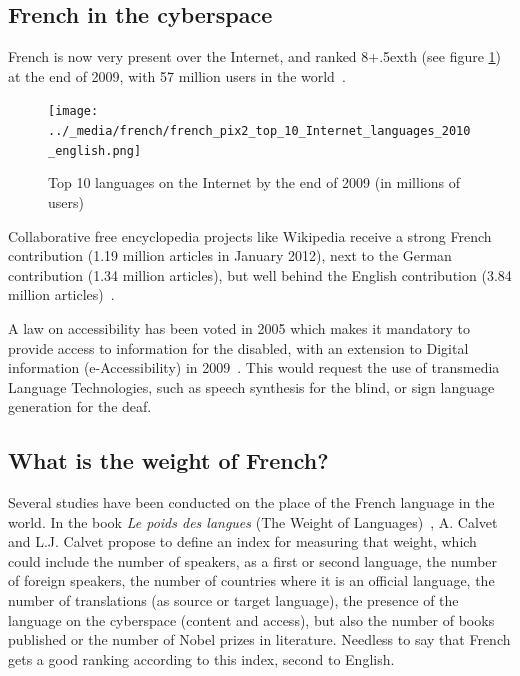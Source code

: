 \begin{multicols}{2}
\subsection{French in the cyberspace}

French is now very present over the Internet, and ranked
8\raise+.5ex\hbox{th} (see figure \ref{fig:internettop10_en}) at the end
of 2009, with 57 million users in the world~\cite{internettop10}.

\begin{figure}[ht]
\begin{center}
 \texttt{[image: ../\_media/french/french\_pix2\_top\_10\_Internet\_languages\_2010\_english.png]}
  \caption{Top 10 languages on the Internet by the end of 2009 (in millions of users)~\cite{internettop10}}
  \label{fig:internettop10_en}
\end{center}
\end{figure}

Collaborative free encyclopedia projects like Wikipedia receive a
strong French contribution (1.19 million articles in January 2012),
next to the German contribution (1.34 million articles), but well behind the English contribution (3.84 million articles)~\cite{wikipediastats}.

A law on accessibility has been voted in 2005 which makes it mandatory
to provide access to information for the disabled, with an extension
to Digital information (e-Accessibility) in 2009~\cite{loi}. This would request
the use of transmedia Language Technologies, such as speech synthesis
for the blind, or sign language generation for the deaf.

\subsection{What is the weight of French?}

Several studies have been conducted on the place of the French
language in the world. In the book {\em Le poids des
langues} (The Weight of Languages)~\cite{calvet09}, A. Calvet and
L.J. Calvet propose to define an index for measuring that weight,
which could include the number of speakers, as a first or second
language, the number of foreign speakers, the number of countries
where it is an official language, the number of translations (as
source or target language), the presence of the language on the
cyberspace (content and access), but also the number of books
published or the number of Nobel prizes in literature. Needless to say
that French gets a good ranking according to this index, second to
English.


\end{multicols}
